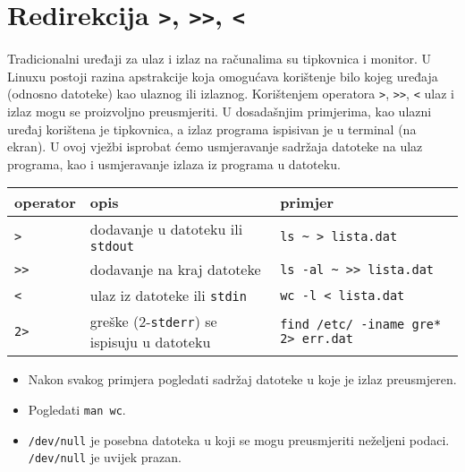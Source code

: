 \section{Redirekcija \lstinline!>!, \lstinline!>>!, \lstinline!<!}



Tradicionalni uređaji za ulaz i izlaz na računalima su tipkovnica i monitor. U Linuxu postoji razina apstrakcije koja omogućava korištenje bilo kojeg uređaja (odnosno datoteke) kao ulaznog ili izlaznog. Korištenjem operatora \lstinline!>!, \lstinline!>>!, \lstinline!<! ulaz i izlaz mogu se proizvoljno preusmjeriti. U dosadašnjim primjerima, kao ulazni uređaj korištena je tipkovnica, a izlaz programa ispisivan je u terminal (na ekran). U ovoj vježbi isprobat ćemo usmjeravanje sadržaja datoteke na ulaz programa, kao i usmjeravanje izlaza iz programa u datoteku.

\begin{tabularx}{\textwidth}{lXl}
\hline
operator & opis & primjer\\
\hline
\lstinline!>! & dodavanje u datoteku ili \texttt{stdout} &  \lstinline!ls ~ > lista.dat!\\
\lstinline!>>! & dodavanje na kraj datoteke & \lstinline!ls -al ~ >> lista.dat!\\
\lstinline!<! & ulaz iz datoteke ili \texttt{stdin} & \lstinline!wc -l < lista.dat!\\ 
\lstinline!2>! & greške (2-\texttt{stderr}) se ispisuju u datoteku & \lstinline!find /etc/ -iname gre* 2> err.dat!\\
\hline
\end{tabularx}

\begin{itemize}
 \item Nakon svakog primjera pogledati sadržaj datoteke u koje je izlaz preusmjeren. 
 \item Pogledati \lstinline!man wc!.
 \item \lstinline!/dev/null! je posebna datoteka u koji se mogu preusmjeriti neželjeni podaci. \lstinline!/dev/null! je uvijek prazan.\\
\end{itemize}

